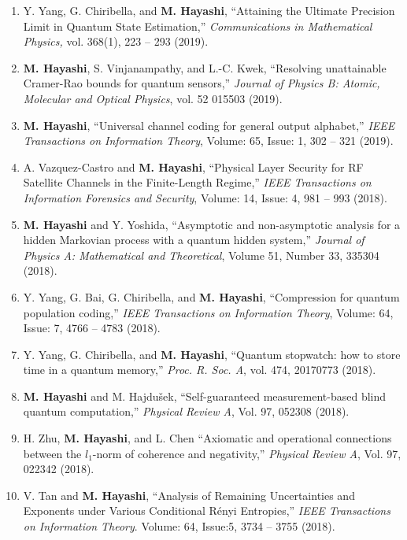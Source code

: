 \documentclass[a4paper,12pt,oneside]{article}
\begin{document}
\begin{enumerate}
\item 
Y. Yang, G. Chiribella, and \textbf{M. Hayashi}, 
``Attaining the Ultimate Precision Limit in Quantum State Estimation,''
{\em Communications in Mathematical Physics,}
vol. 368(1), 223 -- 293 (2019). 

\item 
\textbf{M. Hayashi}, S. Vinjanampathy, and L.-C. Kwek, 
``Resolving unattainable Cramer-Rao bounds for quantum sensors,''
{\em Journal of Physics B: Atomic, Molecular and Optical Physics},
vol. 52 015503 (2019). 

\item 
\textbf{M. Hayashi},
``Universal channel coding for general output alphabet,'' 
{\em IEEE Transactions on Information Theory},
Volume: 65, Issue: 1, 302 -- 321 (2019). 

\item 
A. Vazquez-Castro and \textbf{M. Hayashi},
``Physical Layer Security for RF Satellite Channels in the Finite-Length Regime,'' 
{\em IEEE Transactions on Information Forensics and Security},
Volume: 14, Issue: 4,  981 -- 993 (2018).

\item 
\textbf{M. Hayashi} and Y. Yoshida,
``Asymptotic and non-asymptotic analysis for a hidden Markovian process with a quantum hidden system,''
{\em Journal of Physics A: Mathematical and Theoretical}, 
Volume 51, Number 33, 335304 (2018).

\item 
Y. Yang, G. Bai, G. Chiribella, and \textbf{M. Hayashi}, 
``Compression for quantum population coding,''
{\em IEEE Transactions on Information Theory},
Volume: 64, Issue: 7, 4766 -- 4783 (2018). 

\item 
Y. Yang, G. Chiribella, and
\textbf{M. Hayashi},
``Quantum stopwatch: how to store time in a quantum memory,''
{\em Proc. R. Soc. A}, vol. 474, 20170773 (2018).

\item 
\textbf{M. Hayashi} and M. Hajdu\v{s}ek,
``Self-guaranteed measurement-based blind quantum computation,'' 
{\em Physical Review A}, Vol. 97, 052308 (2018).

\item 
H. Zhu, \textbf{M. Hayashi}, and L. Chen
``Axiomatic and operational connections between the $l_1$-norm of coherence and negativity,''
{\em Physical Review A}, Vol. 97, 022342 (2018).

\item 
V. Tan and \textbf{M. Hayashi},
``Analysis of Remaining Uncertainties and Exponents under Various Conditional R\'{e}nyi Entropies,''
{\em IEEE Transactions on Information Theory}.
Volume: 64, Issue:5, 3734 -- 3755 (2018). 


\end{enumerate}
\end{document}
